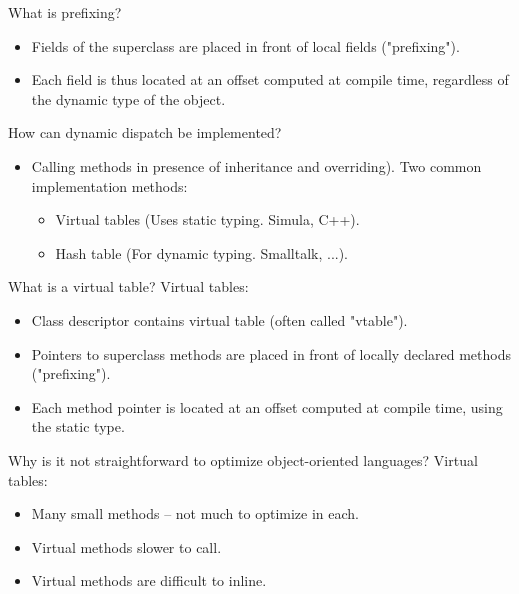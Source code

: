 \documentclass[11pt]{beamer}
\begin{document}
\begin{frame}
\begin{block}{What is prefixing?}
\begin{itemize}


\item Fields of the superclass are placed in front of local fields ("prefixing").
\item Each field is thus located at an offset computed at compile time, regardless of the dynamic type of the object.
\end{itemize}
\end{block}

\begin{block}{How can dynamic dispatch be implemented?}
\begin{itemize}


\item Calling methods in presence of inheritance and overriding). Two common implementation methods:
\begin{itemize}
\item Virtual tables (Uses static typing. Simula, C++).
\item Hash table (For dynamic typing. Smalltalk, ...).
\end{itemize}
\end{itemize}
\end{block}

\end{frame}

\begin{frame}
\begin{block}{What is a virtual table?}
Virtual tables:
\begin{itemize}
\item Class descriptor contains virtual table (often called "vtable").
\item Pointers to superclass methods are placed in front of locally declared methods ("prefixing").
\item Each method pointer is located at an offset computed at compile time, using the static type.
\end{itemize}
\end{block}

\begin{block}{Why is it not straightforward to optimize object-oriented languages? }
Virtual tables:
\begin{itemize}
\item Many small methods – not much to optimize in each.
\item Virtual methods slower to call.
\item Virtual methods are difficult to inline.
\end{itemize}
\end{block}

\end{frame}
\end{document}
